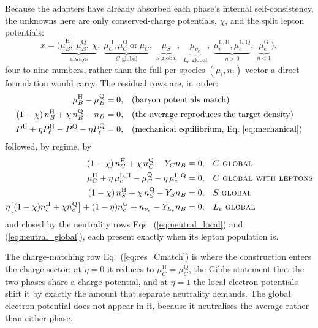 \documentclass[aps,prc,onecolumn,superscriptaddress,nofootinbib,10pt]{revtex4-2}
\newcommand{\nB}{n_B}
\newcommand{\nC}{n_C}
\newcommand{\nS}{n_S}
\newcommand{\muB}{\mu_B}
\newcommand{\muC}{\mu_C}
\newcommand{\muS}{\mu_S}
\newcommand{\mutB}{\tilde\mu_B}
\newcommand{\phH}{\mathrm{H}}
\newcommand{\phQ}{\mathrm{Q}}
\begin{document}
Because the adapters have already absorbed each phase's internal
self-consistency, the unknowns here are only conserved-charge potentials,
$\chi$, and the split lepton potentials:
%
\begin{equation}
x = \Big(
\underbrace{\mutB^\phH,\ \muB^\phQ,\ \chi}_{\text{always}} ,\;
\underbrace{\muC^\phH, \muC^\phQ \ \text{or}\ \muC}_{C \text{ global}} ,\;
\underbrace{\muS}_{S \text{ global}} ,\;
\underbrace{\mu_{\nu_e}}_{L_e \text{ global}} ,\;
\underbrace{\mu_e^{\mathrm{L},\phH}, \mu_e^{\mathrm{L},\phQ}}_{\eta > 0} ,\;
\underbrace{\mu_e^{\mathrm{G}}}_{\eta < 1}
\Big) ,
\label{eq:unknowns}
\end{equation}
%
four to nine numbers, rather than the full per-species $(\mu_i, n_i)$ vector
a direct formulation would carry. The residual rows are, in order:
%
\begin{align}
\muB^\phH - \muB^\phQ &= 0 ,
&& \text{(baryon potentials match)}
\label{eq:res_mub} \\
(1-\chi)\, \nB^\phH + \chi\, \nB^\phQ - \nB &= 0 ,
&& \text{(the average reproduces the target density)}
\label{eq:res_nb} \\
P^\phH + \eta P_\ell^\phH - P^\phQ - \eta P_\ell^\phQ &= 0 ,
&& \text{(mechanical equilibrium, Eq.~\ref{eq:mechanical})}
\label{eq:res_P}
\end{align}
%
followed, by regime, by
%
\begin{align}
(1-\chi)\, \nC^\phH + \chi\, \nC^\phQ - Y_C \nB &= 0 ,
&& C\ \textsc{global}
\label{eq:res_C} \\
\muC^\phH + \eta\, \mu_e^{\mathrm{L},\phH}
   - \muC^\phQ - \eta\, \mu_e^{\mathrm{L},\phQ} &= 0 ,
&& C\ \textsc{global with leptons}
\label{eq:res_Cmatch} \\
(1-\chi)\, \nS^\phH + \chi\, \nS^\phQ - Y_S \nB &= 0 ,
&& S\ \textsc{global}
\label{eq:res_S} \\
\eta \big[ (1-\chi) n_e^\phH + \chi n_e^\phQ \big]
   + (1-\eta) n_e^{\mathrm{G}} + n_{\nu_e} - Y_{L_e} \nB &= 0 ,
&& L_e\ \textsc{global}
\label{eq:res_L}
\end{align}
%
and closed by the neutrality rows Eqs.~(\ref{eq:neutral_local}) and
(\ref{eq:neutral_global}), each present exactly when its lepton population is.

The charge-matching row Eq.~(\ref{eq:res_Cmatch}) is where the construction
enters the charge sector: at $\eta = 0$ it reduces to $\muC^\phH = \muC^\phQ$,
the Gibbs statement that the two phases share a charge potential, and at
$\eta = 1$ the local electron potentials shift it by exactly the amount that
separate neutrality demands. The global electron potential does not appear in
it, because it neutralises the average rather than either phase.
\end{document}
